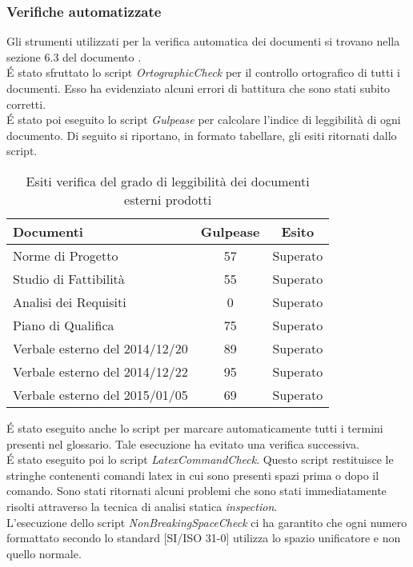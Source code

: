 			\subsubsection{Verifiche automatizzate}
				Gli strumenti utilizzati per la verifica automatica dei documenti si trovano nella sezione 6.3 del documento .\\
				É stato sfruttato lo script \textit{OrtographicCheck} per  il controllo ortografico di tutti i documenti. Esso ha evidenziato alcuni errori di battitura che sono stati subito corretti.\\
				É stato poi eseguito lo script \textit{Gulpease} per calcolare l'indice di leggibilità di ogni documento. Di seguito si riportano, in formato tabellare, gli esiti ritornati dallo script.
				\begin{table}[H]\centering
						\begin{tabu}{| l | c | c |}
							\hline
							Documenti 				& Gulpease	& Esito  \\ \hline
							
							Norme di Progetto 			& 57		& Superato 		 \\
							Studio di Fattibilità 			& 55		& Superato 		 \\
							Analisi dei Requisiti	 			& 0		& Superato 		 \\
							Piano di Qualifica 			& 75		& Superato 	 \\
							Verbale esterno del 2014/12/20 			& 89 		& Superato	\\
							Verbale esterno del 2014/12/22	 	& 95		& Superato 	\\ 
							Verbale esterno del 2015/01/05	& 69		& Superato\\ \hline 
						\end{tabu}
					\caption{Esiti verifica del grado di leggibilità dei documenti esterni prodotti}
				\end{table}
				É stato eseguito anche lo script per marcare automaticamente tutti i termini presenti nel glossario. Tale esecuzione ha evitato una verifica successiva.\\
				É stato eseguito poi lo script \textit{LatexCommandCheck}. Questo script restituisce le stringhe contenenti comandi latex in cui sono presenti spazi prima o dopo il comando. Sono stati ritornati alcuni problemi che sono stati immediatamente risolti attraverso la tecnica di analisi statica \textit{inspection}.\\
				L'esecuzione dello script \textit{NonBreakingSpaceCheck} ci ha garantito che ogni numero formattato secondo lo standard [SI/ISO 31-0] utilizza lo spazio unificatore e non quello normale.